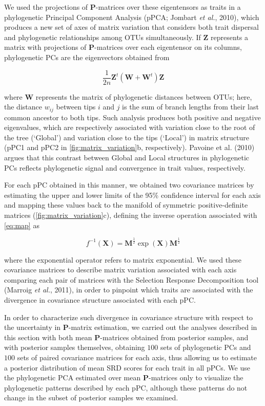 \documentclass[12pt,twoside]{report}
\begin{document}
We used the projections of $\mathbf{P}$-matrices over these eigentensors
as traits in a phylogenetic Principal Component Analysis (pPCA; Jombart
\emph{et al.}, 2010), which produces a new set of axes of matrix
variation that considers both trait dispersal and phylogenetic
relationships among OTUs simultaneously. If $\mathbf{Z}$ represents a
matrix with projections of $\mathbf{P}$-matrices over each eigentensor
on its columns, phylogenetic PCs are the eigenvectors obtained from

\begin{equation}
\frac{1}{2n} \mathbf{Z}^t(\mathbf{W} + \mathbf{W}^t) \mathbf{Z}
\end{equation}

where $\mathbf{W}$ represents the matrix of phylogenetic distances
between OTUs; here, the distance $w_{ij}$ between tips $i$ and $j$ is
the sum of branch lengths from their last common ancestor to both tips.
Such analysis produces both positive and negative eigenvalues, which are
respectively associated with variation close to the root of the tree
(`Global') and variation close to the tips (`Local') in matrix structure
(pPC1 and pPC2 in \autoref{fig:matrix_variation}b, respectively).
Pavoine et al. (2010) argues that this contrast between Global and Local
structures in phylogenetic PCs reflects phylogenetic signal and
convergence in trait values, respectively.

For each pPC obtained in this manner, we obtained two covariance
matrices by estimating the upper and lower limits of the 95\% confidence
interval for each axis and mapping these values back to the manifold of
symmetric positive-definite matrices (\autoref{fig:matrix_variation}c),
defining the inverse operation associated with \autoref{eq:map} as

\begin{equation}
f^{-1}(\mathbf{X}) = \mathbf{M}^{\frac{1}{2}}\exp(\mathbf{X})\mathbf{M}^{\frac{1}{2}}
\label{eq:inv}
\end{equation}

where the exponential operator refers to matrix exponential. We used
these covariance matrices to describe matrix variation associated with
each axis comparing each pair of matrices with the Selection Response
Decomposition tool (Marroig \emph{et al.}, 2011), in order to pinpoint
which traits are associated with the divergence in covariance structure
associated with each pPC.

In order to characterize such divergence in covariance structure with
respect to the uncertainty in $\mathbf{P}$-matrix estimation, we carried
out the analyses described in this section with both mean
$\mathbf{P}$-matrices obtained from posterior samples, and with
posterior samples themselves, obtaining $100$ sets of phylogenetic PCs
and $100$ sets of paired covariance matrices for each axis, thus
allowing us to estimate a posterior distribution of mean SRD scores for
each trait in all pPCs. We use the phylogenetic PCA estimated over mean
$\mathbf{P}$-matrices only to visualize the phylogenetic patterns
described by each pPC, although these patterns do not change in the
subset of posterior samples we examined.
\end{document}
